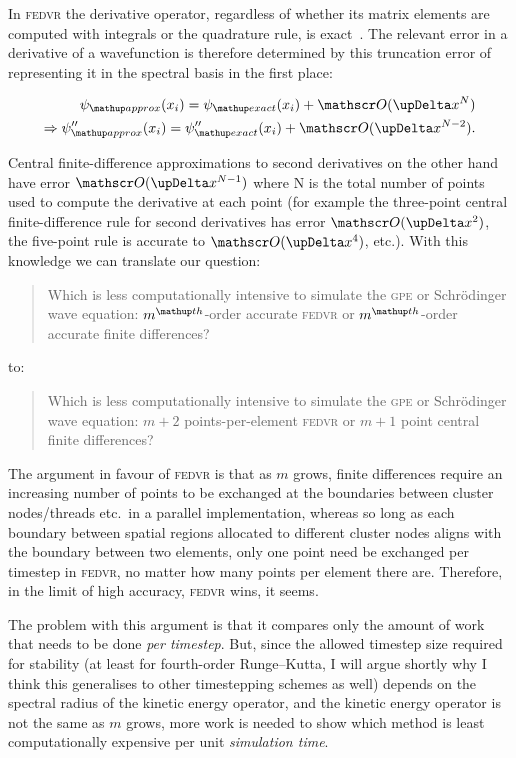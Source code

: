 In \textsc{fedvr} the derivative operator, regardless of whether its matrix elements are computed with integrals or the quadrature rule, is exact~\cite{schneider_discrete_2005}. The relevant error in a derivative of a wavefunction is therefore determined by this truncation error of representing it in the spectral basis in the first place:

\begin{align}
\psi_\up{approx}(x_i) = \psi_\up{exact}(x_i) + \Ord{\upDelta x^N}\\
\Rightarrow\psi^{\prime \prime}_\up{approx}(x_i) =  \psi^{\prime\prime}_\up{exact}(x_i) + \Ord{\upDelta x^{N-2}}.
\end{align} 

Central finite-difference approximations to second derivatives on the other hand have error $\Ord{\upDelta x^{N - 1}}$ where N is the total number of points used to compute the derivative at each point (for example the three-point central finite-difference rule for second derivatives has error $\Ord{\upDelta x^2}$, the five-point rule is accurate to $\Ord{\upDelta x^4}$, etc.). With this knowledge we can translate our question:
\begin{quote}
Which is less computationally intensive to simulate the \textsc{gpe} or Schr\"odinger wave equation: $m^\up{th}$-order accurate \textsc{fedvr} or $m^\up{th}$-order accurate finite differences?
\end{quote}
to:
\begin{quote}
Which is less computationally intensive to simulate the \textsc{gpe} or Schr\"odinger wave equation: $m+2$ points-per-element \textsc{fedvr} or $m+1$ point central finite differences?
\end{quote}
The argument in favour of \textsc{fedvr} is that as $m$ grows, finite differences require an increasing number of points to be exchanged at the boundaries between cluster nodes/threads etc.~in a parallel implementation, whereas so long as each boundary between spatial regions allocated to different cluster nodes aligns with the boundary between two elements, only one point need be exchanged per timestep in \textsc{fedvr}, no matter how many points per element there are. Therefore, in the limit of high accuracy, \textsc{fedvr} wins, it seems.

The problem with this argument is that it compares only the amount of work that needs to be done \emph{per timestep}. But, since the allowed timestep size required for stability (at least for fourth-order Runge--Kutta, I will argue shortly why I think this generalises to other timestepping schemes as well) depends on the spectral radius of the kinetic energy operator, and the kinetic energy operator is not the same as $m$ grows, more work is needed to show which method is least computationally expensive per unit \emph{simulation time}.


